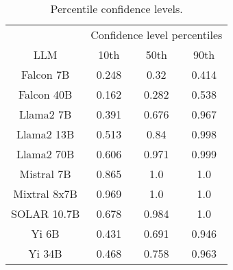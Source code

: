 \begin{table*}
\centering
\begin{tabular}{c|c|c|c}
& \multicolumn{3}{c}{Confidence level percentiles} \\ 
LLM & 10th & 50th & 90th\\ \hline
Falcon 7B & 0.248 & 0.32 & 0.414\\
Falcon 40B & 0.162 & 0.282 & 0.538\\
Llama2 7B & 0.391 & 0.676 & 0.967\\
Llama2 13B & 0.513 & 0.84 & 0.998\\
Llama2 70B & 0.606 & 0.971 & 0.999\\
Mistral 7B & 0.865 & 1.0 & 1.0\\
Mixtral 8x7B & 0.969 & 1.0 & 1.0\\
SOLAR 10.7B & 0.678 & 0.984 & 1.0\\
Yi 6B & 0.431 & 0.691 & 0.946\\
Yi 34B & 0.468 & 0.758 & 0.963\\
\hline
\end{tabular}
\caption{Percentile confidence levels.}
\label{tab:percentile_conf}
\end{table*}
